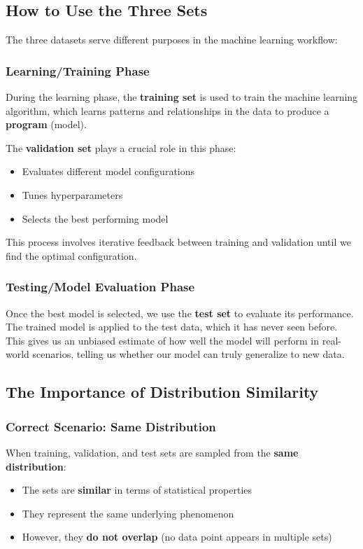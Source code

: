 \documentclass[11pt,a4paper]{article}
\theoremstyle{definition}
\theoremstyle{plain}
\theoremstyle{remark}
\begin{document}
\subsection{How to Use the Three Sets}

The three datasets serve different purposes in the machine learning workflow:

\subsubsection{Learning/Training Phase}

During the learning phase, the \textbf{training set} is used to train the machine learning algorithm, which learns patterns and relationships in the data to produce a \textbf{program} (model). 

The \textbf{validation set} plays a crucial role in this phase:
\begin{itemize}
    \item Evaluates different model configurations
    \item Tunes hyperparameters
    \item Selects the best performing model
\end{itemize}

This process involves iterative feedback between training and validation until we find the optimal configuration.

\subsubsection{Testing/Model Evaluation Phase}

Once the best model is selected, we use the \textbf{test set} to evaluate its performance. The trained model is applied to the test data, which it has never seen before. This gives us an unbiased estimate of how well the model will perform in real-world scenarios, telling us whether our model can truly generalize to new data.

\subsection{The Importance of Distribution Similarity}

\subsubsection{Correct Scenario: Same Distribution}

When training, validation, and test sets are sampled from the \textbf{same distribution}:
\begin{itemize}
    \item The sets are \textbf{similar} in terms of statistical properties
    \item They represent the same underlying phenomenon
    \item However, they \textbf{do not overlap} (no data point appears in multiple sets)
\end{itemize}
\end{document}

